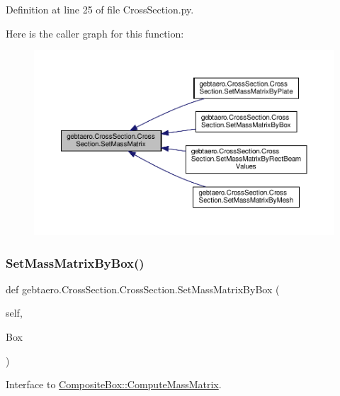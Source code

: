 Definition at line 25 of file Cross\+Section.\+py.

Here is the caller graph for this function\+:\nopagebreak
\begin{figure}[H]
\begin{center}
\leavevmode
\includegraphics[width=350pt]{classgebtaero_1_1_cross_section_1_1_cross_section_a09866889e6a297e305d32daa5d57e1cb_icgraph}
\end{center}
\end{figure}
\mbox{\label{classgebtaero_1_1_cross_section_1_1_cross_section_a4914caf35d9b8cfadafe8e359a590d7c}} 
\subsubsection{\texorpdfstring{Set\+Mass\+Matrix\+By\+Box()}{SetMassMatrixByBox()}}
{\footnotesize\ttfamily def gebtaero.\+Cross\+Section.\+Cross\+Section.\+Set\+Mass\+Matrix\+By\+Box (\begin{DoxyParamCaption}\item[{}]{self,  }\item[{}]{Box }\end{DoxyParamCaption})}



Interface to \hyperlink{classgebtaero_1_1_composite_box_1_1_composite_box_a6b944eeef7002377d7b83c5dd6ae6550}{Composite\+Box\+::\+Compute\+Mass\+Matrix}. 



